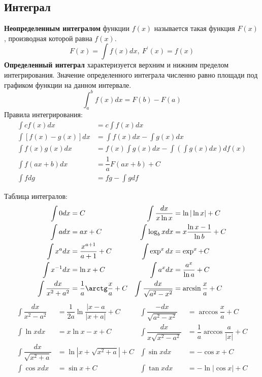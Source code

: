 \subsection{Интеграл}
\textbf{Неопределенным интегралом} функции $f(x)$ называется такая функция $F(x)$, производная которой равна $f(x)$.
\begin{equation}
F(x) = \int f(x)dx,~F^\prime(x)=f(x)
\end{equation}
\textbf{Определенный интеграл} характеризуется верхним и нижним пределом интегрирования. Значение определенного интеграла численно равно площади под графиком функции на данном интервале.
\begin{equation}
\int^b_a f(x)dx = F(b) - F(a)
\end{equation}
Правила интегрирования:
\begin{align*}
\int c f(x) dx &= c \int f(x) dx\\
\int [f(x) - g(x)] dx &= \int f(x) dx - \int g(x) dx \\
\int f(x) g(x) dx &= f(x) \int g(x) dx - \int\left(\int g(x) dx \right) df(x) \\
\int f(ax + b) dx &= \dfrac{1}{a}F(ax + b) + C\\
\int f dg &= fg - \int g df
\end{align*}

Таблица интегралов:
\begin{align*}
\int 0 dx &= C & \int \dfrac{dx}{x \ln x} &= \ln |\ln x| + C \\
\int a dx &= ax + C & \int \log_b x dx &= x\dfrac{\ln x - 1}{\ln b} + C\\
\int x^a dx &= \dfrac{x^{a+1}}{a+1} + C & \int \exp^x dx &= \exp^x + C \\
\int x^{-1} dx &= \ln x + C & \int a^x dx &= \dfrac{a^x}{\ln a} + C\\
\int \dfrac{dx}{x^2 + a^2} &= \dfrac{1}{a} \arctg \dfrac{x}{a} + C & \int \dfrac{dx}{\sqrt{a^2 - x^2}} &= \arcsin\dfrac{x}{a} + C\\
\end{align*}
\begin{align*}
\int \dfrac{dx}{x^2 - a^2} &= \dfrac{1}{2a} \ln \dfrac{|x - a}{|x + a|} + C & \int \dfrac{-dx}{\sqrt{a^2 - x^2}} &= \arccos\dfrac{x}{a} + C\\
\int \ln x dx &= x \ln x - x + C & \int \dfrac{dx}{x \sqrt{x^2 - a^2}} &= \dfrac{1}{a}\arccos\dfrac{a}{|x|} + C\\
\int \dfrac{dx}{\sqrt{x^2 + a}} &= \ln|x + \sqrt{x^2 + a}| + C & \int \sin x dx &= -\cos x + C\\
\int \cos x dx &= \sin x + C & \int \tan x dx &= - \ln|\cos x| + C
\end{align*}